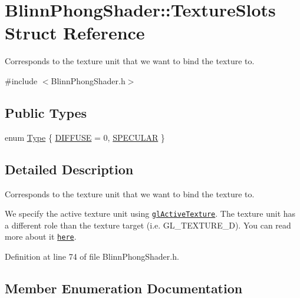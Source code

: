 \hypertarget{struct_blinn_phong_shader_1_1_texture_slots}{}\section{Blinn\+Phong\+Shader\+:\+:Texture\+Slots Struct Reference}
\label{struct_blinn_phong_shader_1_1_texture_slots}


Corresponds to the texture unit that we want to bind the texture to.  




{\ttfamily \#include $<$Blinn\+Phong\+Shader.\+h$>$}

\subsection*{Public Types}
\begin{DoxyCompactItemize}
\item 
enum \hyperlink{struct_blinn_phong_shader_1_1_texture_slots_a98940b49ba855ee47d61a6243c05c34d}{Type} \{ \hyperlink{struct_blinn_phong_shader_1_1_texture_slots_a98940b49ba855ee47d61a6243c05c34da186e353d3c15d10c2020688e6d19f848}{D\+I\+F\+F\+U\+S\+E} = 0, 
\hyperlink{struct_blinn_phong_shader_1_1_texture_slots_a98940b49ba855ee47d61a6243c05c34daecb7e8082bc31bc5bb4318591411eb70}{S\+P\+E\+C\+U\+L\+A\+R}
 \}
\end{DoxyCompactItemize}


\subsection{Detailed Description}
Corresponds to the texture unit that we want to bind the texture to. 

We specify the active texture unit using \href{https://www.opengl.org/sdk/docs/man/html/glActiveTexture.xhtml}{\tt gl\+Active\+Texture}. The texture unit has a different role than the texture target (i.\+e. G\+L\+\_\+\+T\+E\+X\+T\+U\+R\+E\+\_\+D). You can read more about it \href{https://www.opengl.org/wiki/Texture}{\tt here}. 

Definition at line 74 of file Blinn\+Phong\+Shader.\+h.



\subsection{Member Enumeration Documentation}
\hypertarget{struct_blinn_phong_shader_1_1_texture_slots_a98940b49ba855ee47d61a6243c05c34d}{}
